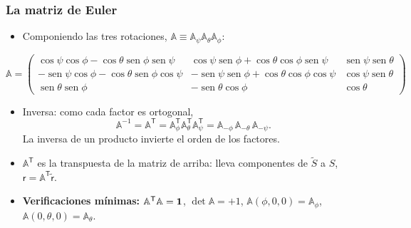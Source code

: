 \documentclass[spanish]{beamer}
\providecommand{\sen}{\operatorname{sen}}       %
\newcommand{\Rot}{\mathbb{A}}                   %
\newcommand{\Slab}{S}                           %
\newcommand{\Scue}{\tilde{S}}                   %
\newcommand{\colLab}[1]{\mathsf{#1}}            %
\newcommand{\colCue}[1]{\tilde{\mathsf{#1}}}    %
\newcommand{\tr}{\mathsf{T}}                    %
\begin{document}
\begin{frame}
  \frametitle{La matriz de Euler}
  \begin{itemize}
    \item<1-> Componiendo las tres rotaciones, $\Rot\equiv\Rot_\psi\Rot_\theta\Rot_\phi$:
  \end{itemize}
  {\scriptsize
  \[
    \Rot=\begin{pmatrix}
      \cos\psi\cos\phi-\cos\theta\sen\phi\sen\psi &
      \cos\psi\sen\phi+\cos\theta\cos\phi\sen\psi &
      \sen\psi\sen\theta\\[2pt]
      -\sen\psi\cos\phi-\cos\theta\sen\phi\cos\psi &
      -\sen\psi\sen\phi+\cos\theta\cos\phi\cos\psi &
      \cos\psi\sen\theta\\[2pt]
      \sen\theta\sen\phi & -\sen\theta\cos\phi & \cos\theta
    \end{pmatrix}
  \]}
  \begin{itemize}
    \item<2-> Inversa: como cada factor es ortogonal,
          \[
            \Rot^{-1}=\Rot^{\tr}
            =\Rot_\phi^{\tr}\Rot_\theta^{\tr}\Rot_\psi^{\tr}
            =\Rot_{-\phi}\,\Rot_{-\theta}\,\Rot_{-\psi}.
          \]
          La inversa de un producto invierte el orden de los factores.
    \item<3-> $\Rot^{\tr}$ es la transpuesta de la matriz de arriba: lleva componentes de
          $\Scue$ a $\Slab$, $\colLab{r}=\Rot^{\tr}\colCue{r}$.
    \item<4-> \textbf{Verificaciones mínimas:} $\Rot^{\tr}\Rot=\Id$, $\det\Rot=+1$,
          $\Rot(\phi,0,0)=\Rot_\phi$, $\Rot(0,\theta,0)=\Rot_\theta$.
  \end{itemize}
\end{frame}
\end{document}
